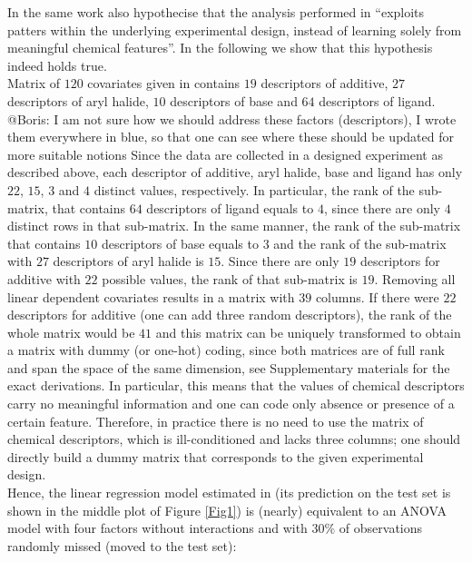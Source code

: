 \documentclass[12pt]{article}
\begin{document}
In the same work \citet{Chuang2018} also hypothecise that the analysis performed in \citet{Ahneman2018} ``exploits patters within the underlying experimental design, instead of learning solely from meaningful chemical features''. In the following we show that this hypothesis indeed holds true. \\
Matrix of $120$ covariates given in \citet{Ahneman2018} contains $19$ descriptors of {\color{blue} additive}, $27$ descriptors of {\color{blue} aryl halide}, $10$ descriptors of {\color{blue} base} and $64$ descriptors of {\color{blue} ligand}. {\color{red}@Boris: I am not sure how we should address these factors (descriptors), I wrote them everywhere in blue, so that one can see where these should be updated for more suitable notions} Since the data are collected in a designed experiment as described above, each descriptor of {\color{blue} additive, aryl halide, base and ligand} has only $22$, $15$, $3$ and $4$ distinct values, respectively. In particular, the rank of the sub-matrix, that contains $64$ descriptors of {\color{blue} ligand} equals to $4$, since there are only $4$ distinct rows in that sub-matrix. In the same manner, the rank of the sub-matrix that contains $10$ descriptors of {\color{blue} base} equals to $3$ and the rank of the sub-matrix with $27$ descriptors of {\color{blue} aryl halide} is $15$. Since there are only $19$ descriptors for {\color{blue} additive} with $22$ possible values, the rank of that sub-matrix is $19$. Removing all linear dependent covariates results in a matrix with $39$ columns. If there were $22$ descriptors for {\color{blue} additive} (one can add three random descriptors), the rank of the whole matrix would be $41$ and this matrix can be uniquely transformed to obtain a matrix with dummy (or one-hot) coding, since both matrices are of full rank and span the space of the same dimension, see Supplementary materials for the exact derivations. In particular, this means that the values of chemical descriptors carry no meaningful information and one can code only absence or presence of a certain feature. Therefore, in practice there is no need to use the matrix of chemical descriptors, which is ill-conditioned and lacks three columns; one should directly build a dummy matrix that corresponds to the given experimental design. \\
Hence, the linear regression model estimated in \citet{Ahneman2018} (its prediction on the test set is shown in the middle plot of Figure \ref{Fig1}) is (nearly) equivalent to an ANOVA model with four factors without interactions and with $30\%$ of observations randomly missed (moved to the test set):
\end{document}
